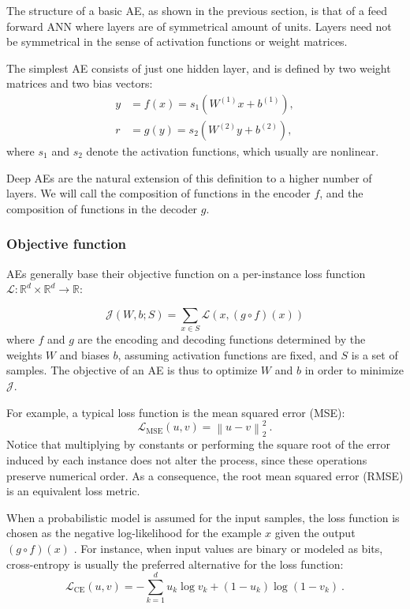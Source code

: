 The structure of a basic AE, as shown in the previous section, is that of a feed forward ANN where layers are of symmetrical amount of units. Layers need not be symmetrical in the sense of activation functions or weight matrices.

The simplest AE consists of just one hidden layer, and is defined by two weight matrices and two bias vectors:
\begin{align}
  y&=f(x)=s_1(W^{(1)}x+b^{(1)}),\\
  r&=g(y)=s_2(W^{(2)}y+b^{(2)}),
\end{align}
where $s_1$ and $s_2$ denote the activation functions, which usually are nonlinear.

Deep AEs are the natural extension of this definition to a higher number of layers. We will call the composition of functions in the encoder $f$, and the composition of functions in the decoder $g$.

\subsubsection{Objective function}

AEs generally base their objective function on a per-instance loss function $\mathcal L:\mathbb R^d\times \mathbb R^d\rightarrow \mathbb R$:

\begin{equation}
\mathcal J(W,b;S)= \sum_{x \in S} \mathcal L(x, (g\circ f)(x))
\end{equation}
where $f$ and $g$ are the encoding and decoding functions determined by the weights $W$ and biases $b$, assuming activation functions are fixed, and $S$ is a set of samples. The objective of an AE is thus to optimize $W$ and $b$ in order to minimize $\mathcal J$.

For example, a typical loss function is the mean squared error (MSE):
\begin{equation}
\mathcal L_{\mathrm{MSE}}(u, v)=\left\lVert u - v\right\rVert_2^2~.
\end{equation}
Notice that multiplying by constants or performing the square root of the error induced by each instance does not alter the process, since these operations preserve numerical order. As a consequence, the root mean squared error (RMSE) is an equivalent loss metric.

When a probabilistic model is assumed for the input samples, the loss function is chosen as the negative log-likelihood for the example $x$ given the output $(g\circ f)(x)$ \cite{LayerwiseTraining}. For instance, when input values are binary or modeled as bits, cross-entropy is usually the preferred alternative for the loss function:
\begin{equation}
  \mathcal L_{\mathrm{CE}}(u, v)=-\sum_{k=1}^d u_k \log v_k + (1 - u_k)\log(1 - v_k)~.
\end{equation}

